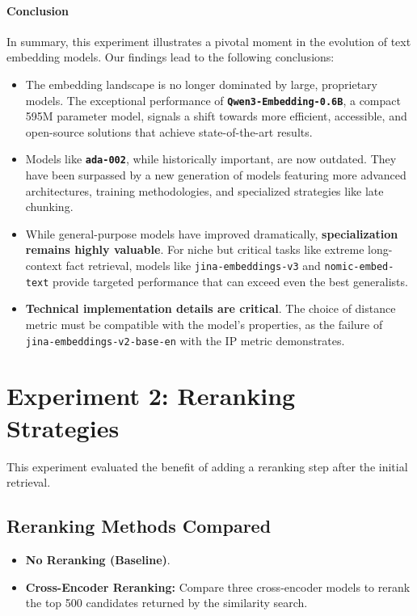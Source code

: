 \paragraph{Conclusion}
In summary, this experiment illustrates a pivotal moment in the evolution of text embedding models. Our findings lead to the following conclusions:
\begin{itemize}
    \item The embedding landscape is no longer dominated by large, proprietary models. The exceptional performance of \textbf{\texttt{Qwen3-Embedding-0.6B}}, a compact 595M parameter model, signals a shift towards more efficient, accessible, and open-source solutions that achieve state-of-the-art results.
    \item Models like \textbf{\texttt{ada-002}}, while historically important, are now outdated. They have been surpassed by a new generation of models featuring more advanced architectures, training methodologies, and specialized strategies like late chunking.
    \item While general-purpose models have improved dramatically, \textbf{specialization remains highly valuable}. For niche but critical tasks like extreme long-context fact retrieval, models like \texttt{jina-embeddings-v3} and \texttt{nomic-embed-text} provide targeted performance that can exceed even the best generalists.
    \item \textbf{Technical implementation details are critical}. The choice of distance metric must be compatible with the model's properties, as the failure of \texttt{jina-embeddings-v2-base-en} with the IP metric demonstrates.
\end{itemize}



\section{Experiment 2: Reranking Strategies}
\label{sec:exp_reranking}
This experiment evaluated the benefit of adding a reranking step after the initial retrieval.
\subsection{Reranking Methods Compared}
\begin{itemize}
    \item \textbf{No Reranking (Baseline)}.
    \item \textbf{Cross-Encoder Reranking:} Compare three cross-encoder models to rerank the top 500 candidates returned by the similarity search.
\end{itemize}
